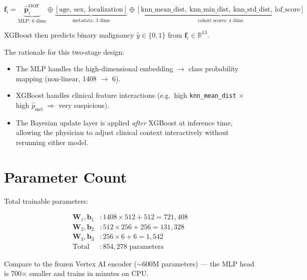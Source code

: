 \documentclass[12pt]{article}
\begin{document}
\[
\bm{f}_i =
\underbrace{\hat{\bm{p}}_i^{\text{OOF}}}_{\text{MLP: 6 dims}}
\oplus
\underbrace{[\text{age},\ \text{sex},\ \text{localization}]}_{\text{metadata: 3 dims}}
\oplus
\underbrace{[\text{knn\_mean\_dist},\ \text{knn\_min\_dist},\ \text{knn\_std\_dist},\ \text{lof\_score}]}_{\text{cohort scores: 4 dims}}
\]

XGBoost then predicts binary malignancy $\hat{y} \in \{0, 1\}$ from
$\bm{f}_i \in \mathbb{R}^{13}$.

\medskip
\noindent The rationale for this two-stage design:
\begin{itemize}
    \item The MLP handles the high-dimensional embedding $\rightarrow$ class
    probability mapping (non-linear, 1408 $\rightarrow$ 6).
    \item XGBoost handles clinical feature interactions
    (e.g.\ high \texttt{knn\_mean\_dist} $\times$ high $\hat{p}_\text{mel}$ $\Rightarrow$ very suspicious).
    \item The Bayesian update layer is applied \textit{after} XGBoost at
    inference time, allowing the physician to adjust clinical context
    interactively without rerunning either model.
\end{itemize}

\section{Parameter Count}

Total trainable parameters:

\begin{align*}
\bm{W}_1,\bm{b}_1 &: 1408 \times 512 + 512 = 721{,}408 \\
\bm{W}_2,\bm{b}_2 &: 512 \times 256 + 256 = 131{,}328 \\
\bm{W}_3,\bm{b}_3 &: 256 \times 6 + 6 = 1{,}542 \\
\hline
\text{Total} &: 854{,}278 \text{ parameters}
\end{align*}

Compare to the frozen Vertex AI encoder ($\sim$600M parameters) --- the MLP
head is 700$\times$ smaller and trains in minutes on CPU.
\end{document}
